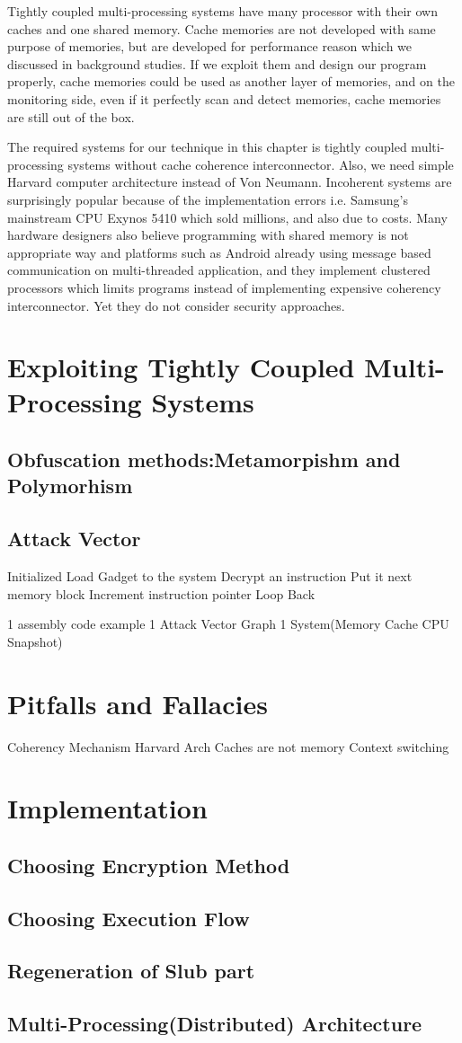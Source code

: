 Tightly coupled multi-processing systems have many processor with their own caches and one shared memory\cite{Jim2007}. Cache memories are not developed with same purpose of memories, but are developed for performance reason which we discussed in background studies. If we exploit them and design our program properly, cache memories could be used as another layer of memories, and on the monitoring side, even if it perfectly scan and detect memories, cache memories are still out of the box.

The required systems for our technique in this chapter is tightly coupled multi-processing systems without cache coherence interconnector. Also, we need simple Harvard computer architecture instead of Von Neumann. Incoherent systems are surprisingly popular because of the implementation errors i.e. Samsung's mainstream CPU Exynos 5410 which sold millions, and also due to costs. Many hardware designers also believe programming with shared memory is not appropriate way and platforms such as Android already using message based communication on multi-threaded application, and  they implement clustered processors which limits programs instead of implementing expensive coherency interconnector. Yet they do not consider security approaches.
	\section{Exploiting Tightly Coupled Multi-Processing Systems}
		\subsection{Obfuscation methods:Metamorpishm and Polymorhism}
		\subsection{Attack Vector}
		Initialized 
		Load Gadget to the system
		Decrypt an instruction
		Put it next memory block
		Increment instruction pointer
		Loop Back 

		1 assembly code example 
		1 Attack Vector Graph 
		1 System(Memory Cache CPU Snapshot)
		\section{Pitfalls and Fallacies}
			Coherency Mechanism
			Harvard Arch
			Caches are not memory
			Context switching

			\section{Implementation}
				\subsection{Choosing Encryption Method}
				\subsection{Choosing Execution Flow}
				\subsection{Regeneration of Slub part}
				\subsection{Multi-Processing(Distributed) Architecture}